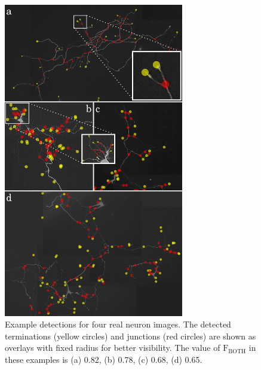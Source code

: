 \begin{figure}
	\centering
	\includegraphics[width=0.7\textwidth,height=0.7\textheight,keepaspectratio]{det_real}
	\caption{Example detections for four real neuron images. The detected terminations (yellow circles) and junctions (red circles) are shown as overlays with fixed radius for better visibility. The value of $\textrm{F}_\textrm{BOTH}$ in these examples is (a) 0.82, (b) 0.78, (c) 0.68, (d) 0.65.}
	\label{fig18}
\end{figure}
